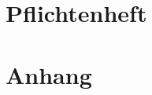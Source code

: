 \documentclass
[   twoside=false,     %
    fontsize=12pt,     %
    DIV=15,            %
    BCOR=17mm,         %
    headsepline,  %
    footsepline,  %
    open=right,        %
    paper=a4,          %
    abstract=true,     %
    listof=totoc,      %
    bibliography=totoc,%
    titlepage,         %
    headinclude=true,  %
    footinclude=false, %
    numbers=noenddot   %
]   {scrreprt}         %
\begin{document}
\onehalfspacing

%

\cleardoublepage %
\pagestyle{scrheadings} %
\tableofcontents

\cleardoublepage %

\part*{Pflichtenheft}














\appendix
\part*{Anhang}



\end{document}
